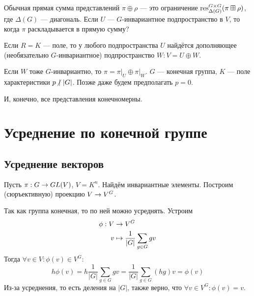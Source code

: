 Обычная прямая сумма представлений $\pi \oplus \rho$ --- это ограничение $\operatorname{res}_{\Delta(G)}^{G \times G}(\pi \boxplus \rho)$, где $\Delta(G)$ --- диагональ.
\ok
Если $U$ --- $G$-инвариантное подпространство в $V$, то когда $\pi$ раскладывается в прямую сумму?

Если $R = K$ --- поле, то у любого подпространства $U$ найдётся дополняющее (необязательно $G$-инвариантное) подпространство $W: V = U \oplus W$.

Если $W$ тоже $G$-инвариантно, то $\pi = \pi\Big|_U \oplus \pi\Big|_W$.
$G$ --- конечная группа, $K$ --- поле характеристики $p \;\!{\not|}~ |G|$.
Позже даже будем предполагать $p = 0$.

И, конечно, все представления конечномерны.


\section{Усреднение по конечной группе}

\subsection{Усреднение векторов}
Пусть $\pi: G \rightarrow GL(V)$, $V = K^n$.
Найдём инвариантные элементы.
Построим (сюръективную) проекцию $V \rightarrow V^G$.

Так как группа конечная, то по ней можно усреднять.
Устроим \begin{align*}
            \phi: V & \rightarrow V^G \\ v &\mapsto \frac{1}{|G|}\sum\limits_{g \in G} gv
\end{align*}
Тогда $\forall v \in V: \phi(v) \in V^G$:
\[h \phi(v) = h \frac{1}{|G|}\sum\limits_{g \in G}gv = \frac{1}{|G|}\sum\limits_{g \in G}(hg)v = \phi(v)\]
Из-за усреднения, то есть деления на $|G|$, также верно, что $\forall v \in V^G: \phi(v) = v$.


